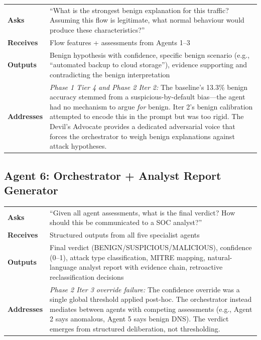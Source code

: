 \documentclass[12pt, a4paper, oneside]{report}
\begin{document}
\begin{table}[H]
\centering
\begin{tabular}{@{}lp{10cm}@{}}
\toprule
\textbf{Asks}     & ``What is the strongest benign explanation for this traffic?
                     Assuming this flow is legitimate, what normal behaviour
                     would produce these characteristics?'' \\
\textbf{Receives}  & Flow features + assessments from Agents 1--3 \\
\textbf{Outputs}   & Benign hypothesis with confidence, specific benign scenario
                     (e.g., ``automated backup to cloud storage''), evidence
                     supporting and contradicting the benign interpretation \\
\textbf{Addresses} & \emph{Phase 1 Tier 4 and Phase 2 Iter 2:} The baseline's
                     13.3\% benign accuracy stemmed from a suspicious-by-default
                     bias---the agent had no mechanism to argue \emph{for} benign.
                     Iter 2's benign calibration attempted to encode this in the
                     prompt but was too rigid. The Devil's Advocate provides
                     a dedicated adversarial voice that forces the orchestrator
                     to weigh benign explanations against attack hypotheses. \\
\bottomrule
\end{tabular}
\end{table}

\subsection{Agent 6: Orchestrator + Analyst Report Generator}

\begin{table}[H]
\centering
\begin{tabular}{@{}lp{10cm}@{}}
\toprule
\textbf{Asks}     & ``Given all agent assessments, what is the final verdict?
                     How should this be communicated to a SOC analyst?'' \\
\textbf{Receives}  & Structured outputs from all five specialist agents \\
\textbf{Outputs}   & Final verdict (BENIGN/SUSPICIOUS/MALICIOUS), confidence
                     (0--1), attack type classification, MITRE mapping,
                     natural-language analyst report with evidence chain,
                     retroactive reclassification decisions \\
\textbf{Addresses} & \emph{Phase 2 Iter 3 override failure:} The confidence
                     override was a single global threshold applied post-hoc.
                     The orchestrator instead mediates between agents with
                     competing assessments (e.g., Agent 2 says anomalous, Agent 5
                     says benign DNS). The verdict emerges from structured
                     deliberation, not thresholding. \\
\bottomrule
\end{tabular}
\end{table}
\end{document}
